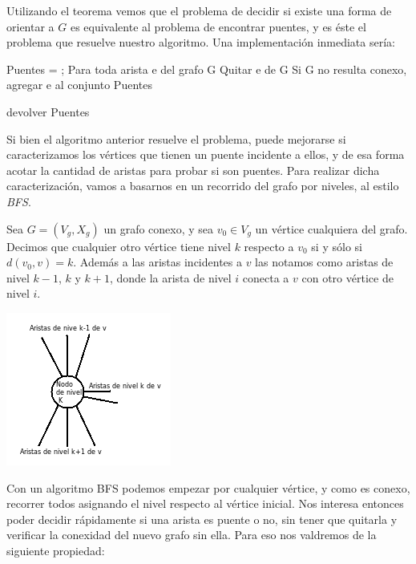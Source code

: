 Utilizando el teorema vemos que el problema de decidir si existe una forma de orientar a $G$ es equivalente al problema de encontrar puentes, y es éste el problema que resuelve nuestro algoritmo. 
Una implementación inmediata sería: \\

\begin{verbatimtab}
Puentes = {};
Para toda arista e del grafo G
    Quitar e de G
    Si G no resulta conexo, agregar e al conjunto Puentes

devolver Puentes
\end{verbatimtab}

Si bien el algoritmo anterior resuelve el problema, puede mejorarse si caracterizamos los vértices que tienen un puente incidente a ellos, y de esa forma acotar la cantidad de aristas para probar 
si son puentes. Para realizar dicha caracterización, vamos a basarnos en un recorrido del grafo por niveles, al estilo \textit{BFS}.

\begin{definition}
Sea $G=(V_g, X_g)$ un grafo conexo, y sea $v_0 \in V_g$ un vértice cualquiera del grafo. Decimos que cualquier otro vértice tiene nivel $k$ respecto a $v_0$ si y sólo si $d(v_0, v)=k$. 
Además a las aristas incidentes a $v$ las notamos como aristas de nivel $k-1$, $k$ y $k+1$, donde la arista de nivel $i$ conecta a $v$ con otro vértice de nivel $i$.

\begin{center}
 \includegraphics{img/ej2/nodo_nivel_k.png}
\end{center}
\end{definition}

Con un algoritmo BFS podemos empezar por cualquier vértice, y como es conexo, recorrer todos asignando el nivel respecto al vértice inicial. Nos interesa entonces poder decidir 
rápidamente si una arista es puente o no, sin tener que quitarla y verificar la conexidad del nuevo grafo sin ella. Para eso nos valdremos de la siguiente propiedad:

